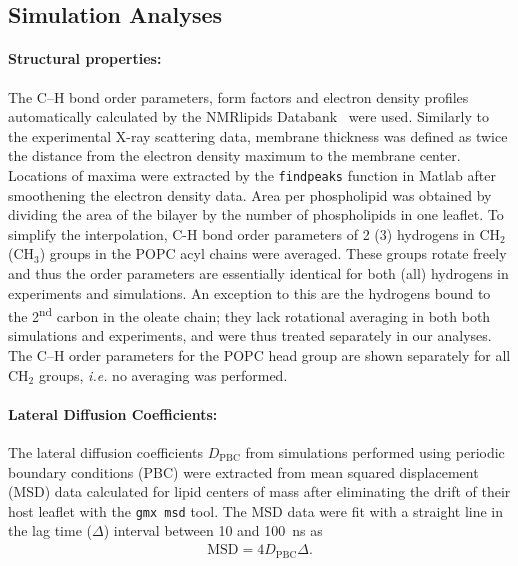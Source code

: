 \documentclass[journal=jctcce]{achemso}
\begin{document}
\subsection{Simulation Analyses}

\paragraph{Structural properties:} The C--H bond order parameters, form factors and electron density profiles 
automatically calculated by the NMRlipids Databank~\cite{NMRlipidsDatabank} 
were used. Similarly to the experimental X-ray scattering data, membrane thickness was defined as twice the distance from the electron density maximum to the membrane center. Locations of maxima were extracted by the \texttt{findpeaks} function in Matlab after smoothening the electron density data. Area per phospholipid was obtained by dividing the area of the bilayer by the number of phospholipids in one leaflet. 
%
To simplify the interpolation, C-H bond order parameters of 2 (3) hydrogens in CH$_2$ (CH$_3$) groups in the POPC acyl chains were averaged. These groups rotate freely and thus the order parameters are essentially identical for both (all) hydrogens in experiments and simulations.
An exception to this are the hydrogens bound to the 2\textsuperscript{nd} carbon in the oleate chain; they lack rotational averaging in both both simulations and experiments, and were thus treated separately in our analyses. The C--H order parameters for the POPC head group 
are shown separately for all CH$_2$ groups, \textit{i.e.} no averaging was performed. 


\paragraph{Lateral Diffusion Coefficients:} The lateral diffusion coefficients $D_\mathrm{PBC}$ from simulations performed using periodic boundary conditions (PBC) were extracted from mean squared displacement (MSD) data calculated for lipid centers of mass after eliminating the drift of their host leaflet with the \texttt{gmx msd} tool. The MSD data were fit with a straight line in the lag time ($\Delta$) interval between 10 and 100~ns as
%
\begin{align}
	\mathrm{MSD}=4D_\mathrm{PBC}\Delta.
\end{align}
\end{document}
